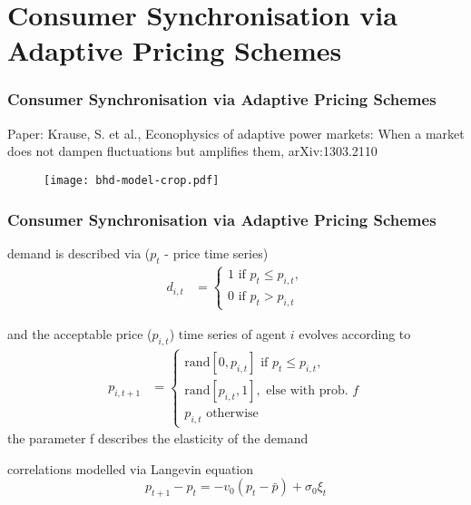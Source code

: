 \documentclass[10pt,aspectratio=169,dvipsnames]{beamer}
\begin{document}
 \section{Consumer Synchronisation via Adaptive Pricing Schemes}
\begin{frame}
  \frametitle{Consumer Synchronisation via Adaptive Pricing Schemes}

  Paper: Krause, S. et al., Econophysics of adaptive power markets: When a market does not dampen fluctuations but amplifies them, arXiv:1303.2110
    \begin{figure}
     \texttt{[image: bhd-model-crop.pdf]}
  \end{figure}
  \end{frame}
\begin{frame}
  \frametitle{Consumer Synchronisation via Adaptive Pricing Schemes}


demand is described via ($p_t$ - price time series)
\begin{align*}
 d_{i,t} &= \begin{cases}
1 \text{ if } p_t \leq p_{i,t},\\
0 \text{ if } p_t > p_{i,t}
\end{cases}
\end{align*}

and the acceptable price ($p_{i,t}$) time series of agent $i$ evolves according to
\begin {align*}
 p_{i,t+1} &= \begin{cases}
\text{rand}[0,p_{i,t}] \text{ if } p_t \leq p_{i,t},\\
\text{rand}[p_{i,t},1], \text{ else with prob. } f\\
p_{i,t} \text{ otherwise }
\end{cases}
\end {align*}
the parameter f describes the elasticity of the demand


correlations modelled via Langevin equation
\begin{equation*}
p_{t+1} - p_t = -v_0 (p_t - \bar{p}) + \sigma_0 \xi_t
\end{equation*}



\end{frame}
\end{document}
